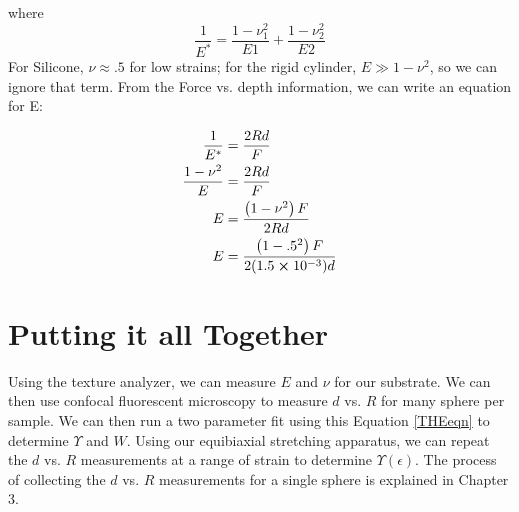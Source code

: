 where 
\begin{equation*}
\frac{1}{E^*} = \frac{1-\nu_1^2}{E1} + \frac{1-\nu_2^2}{E2}
\end{equation*}
For Silicone, $ \nu \approx .5$ for low strains; for the rigid cylinder, $ E \gg 1-\nu^2 $, so we can ignore that term. From the Force vs. depth information, we can write an equation for E:

\begin{align}
\frac{1}{E^*} &= \frac{2Rd}{F} \\
\frac{1 -\nu^2}{E} &= \frac{2Rd}{F} \\
E &= \frac{\left( 1-\nu^2 \right) F}{2Rd} \\
E &= \frac{\left( 1-.5^2 \right) F}{2(1.5 \cross 10^{-3})d}
\end{align}


\section{Putting it all Together}
Using the texture analyzer, we can measure $ E $ and $ \nu $ for our substrate. We can then use confocal fluorescent microscopy to measure $ d $ vs. $ R $ for many sphere per sample. We can then run a two parameter fit using this Equation \ref{THEeqn} to determine $ \Upsilon $ and $ W $. Using our equibiaxial stretching apparatus, we can repeat the $ d $ vs. $ R $ measurements at a range of strain to determine $ \Upsilon(\epsilon) $. The process of collecting the $ d $ vs. $ R $ measurements for a single sphere is explained in Chapter 3.

%